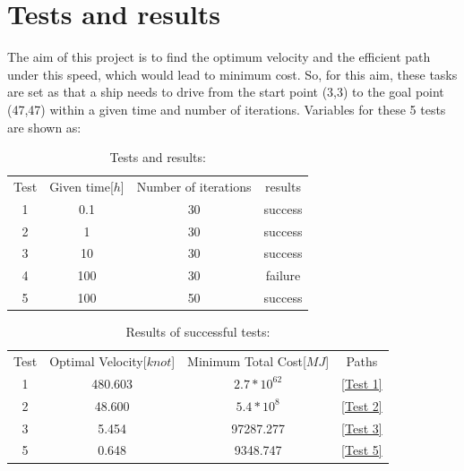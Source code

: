\section{Tests and results}
\label{TestResults}
The aim of this project is to find the optimum velocity and the efficient path under this speed, which would lead to minimum cost. So, for this aim, these tasks are set as that a ship needs to drive from the start point (3,3) to the goal point (47,47) within a given time and number of iterations. Variables for these 5 tests are shown as:
\begin{table}[H]
    \begin{center}
        \caption{Tests and results:}
        \label{T&R}
        \begin{tabular}{cccc}
            \hline
            Test & Given time[$h$] & Number of iterations & results \\ 
            \cline{1-4}
            1 & 0.1 & 30 & success\\
            2 & 1 & 30 & success\\
            3 & 10 & 30 & success\\
            4 & 100 & 30 & failure \\
            5 & 100 & 50 & success\\
            \hline
        \end{tabular}
    \end{center}
\end{table}
\begin{table}[H]
    \begin{center}
        \caption{Results of successful tests:}
        \label{VandC}
        \begin{tabular}{cccc}
            \hline
            Test & Optimal Velocity[$knot$] & Minimum Total Cost[$MJ$] & Paths \\ 
            \cline{1-4}
            1 & 480.603 & $2.7*10^{62}$ & \autoref{Test 1} \\
            2 & 48.600 & $5.4*10^8$ & \autoref{Test 2} \\
            3 & 5.454 & 97287.277 & \autoref{Test 3} \\
            5 & 0.648 & 9348.747 & \autoref{Test 5} \\
            \hline
        \end{tabular}
    \end{center}
\end{table}
